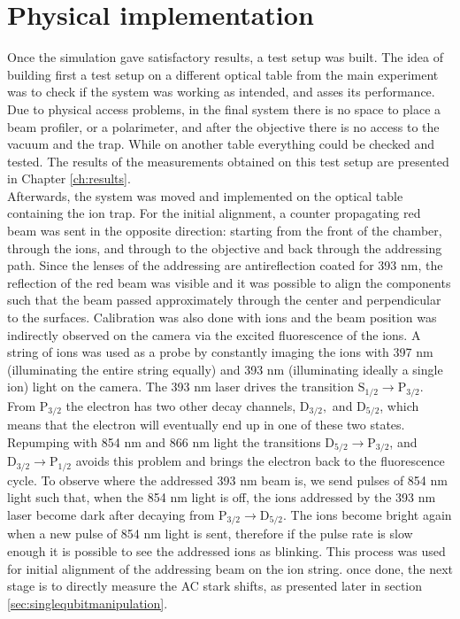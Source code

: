 \section{Physical implementation}
\label{design4}
Once the simulation gave satisfactory results, a test setup was built. The idea of building first a test setup on a different optical table from the main experiment was to check if the system was working as intended, and asses its performance. Due to physical access problems, in the final system there is no space to place a beam profiler, or a polarimeter, and after the objective there is no access to the vacuum and the trap. While on another table everything could be checked and tested. The results of the measurements obtained on this test setup are presented in Chapter \ref{ch:results}.\\
Afterwards, the system was moved and implemented on the optical table containing the ion trap. For the initial alignment, a counter propagating red beam was sent in the opposite direction: starting from the front of the chamber, through the ions, and through to the objective and back through the addressing path. Since the lenses of the addressing are antireflection coated for 393 nm, the reflection of the red beam was visible and it was possible to align the components such that the beam passed approximately through the center and perpendicular to the surfaces. Calibration was also done with ions and the beam position was indirectly observed on the camera via the excited fluorescence of the ions. A string of ions was used as a probe by constantly imaging the ions with 397 nm (illuminating the entire string equally) and 393 nm (illuminating ideally a single ion) light on the camera. The 393 nm laser drives the transition $\text{S}_{1/2}\to \text{P}_{3/2}$. From $\text{P}_{3/2}$ the electron has two other decay channels, $\text{D}_{3/2},$ and $\text{D}_{5/2}$, which means that the electron will eventually end up in one of these two states. Repumping with 854 nm and 866 nm light the transitions $\text{D}_{5/2}\to \text{P}_{3/2}$, and $\text{D}_{3/2}\to \text{P}_{1/2}$ avoids this problem and brings the electron back to the fluorescence cycle. To observe where the addressed 393 nm beam is, we send pulses of 854 nm light
such that, when the 854 nm light is off, the ions addressed by the 393 nm laser become dark after decaying from $\text{P}_{3/2}\to  \text{D}_{5/2}$. The ions become bright again when a new pulse of 854 nm light is sent, therefore if the pulse rate is slow enough it is possible to see the addressed ions as blinking. This process was used for initial alignment of the addressing beam on the ion string. once done, the next stage is to directly measure the AC stark shifts, as presented later in section \ref{sec:singlequbitmanipulation}.\\
